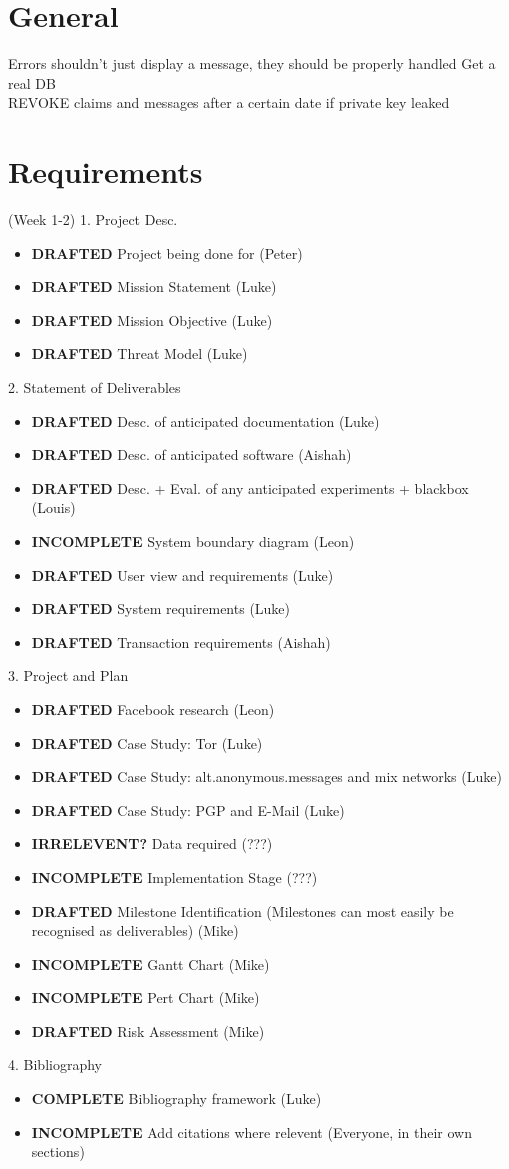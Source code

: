 \section{General}
Errors shouldn't just display a message, they should be properly handled
Get a real DB\\
REVOKE claims and messages after a certain date if private key leaked\\

\section{Requirements} (Week 1-2)
1. Project Desc.
\begin{itemize}
\item \textbf{DRAFTED} Project being done for (Peter)
\item \textbf{DRAFTED} Mission Statement (Luke)
\item \textbf{DRAFTED} Mission Objective (Luke)
\item \textbf{DRAFTED} Threat Model (Luke)
\end{itemize}

2. Statement of Deliverables
\begin{itemize}
\item \textbf{DRAFTED}    Desc. of anticipated documentation (Luke)
\item \textbf{DRAFTED}    Desc. of anticipated software (Aishah)
\item \textbf{DRAFTED}    Desc. + Eval. of any anticipated experiments + blackbox (Louis)
\item \textbf{INCOMPLETE} System boundary diagram (Leon)
\item \textbf{DRAFTED}    User view and requirements (Luke)
\item \textbf{DRAFTED}    System requirements (Luke)
\item \textbf{DRAFTED}    Transaction requirements (Aishah)
\end{itemize}

3. Project and Plan
\begin{itemize}
\item \textbf{DRAFTED}     Facebook research (Leon)
\item \textbf{DRAFTED}     Case Study: Tor (Luke)
\item \textbf{DRAFTED}     Case Study: alt.anonymous.messages and mix networks (Luke)
\item \textbf{DRAFTED}     Case Study: PGP and E-Mail (Luke)
\item \textbf{IRRELEVENT?} Data required (???)
\item \textbf{INCOMPLETE}  Implementation Stage (???)
\item \textbf{DRAFTED}     Milestone Identification (Milestones can most easily be recognised as deliverables) (Mike)
\item \textbf{INCOMPLETE}  Gantt Chart (Mike)
\item \textbf{INCOMPLETE}  Pert Chart (Mike)
\item \textbf{DRAFTED}     Risk Assessment (Mike)
\end{itemize}

4. Bibliography
\begin{itemize}
\item \textbf{COMPLETE}   Bibliography framework (Luke)
\item \textbf{INCOMPLETE} Add citations where relevent (Everyone, in their own sections)
\end{itemize}
